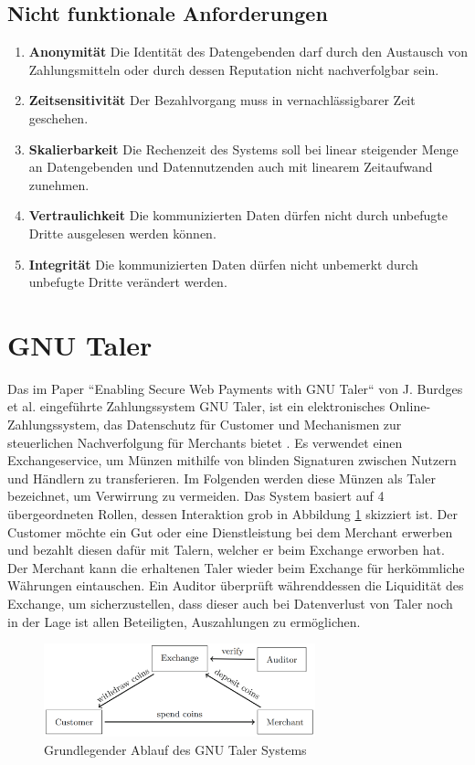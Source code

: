 \documentclass[11pt,a4paper]{scrreprt}
\begin{document}
\subsection{Nicht funktionale Anforderungen}
\label{enum:req:nichtfunktional}
\begin{enumerate}
    \item \textbf{Anonymität} Die Identität des Datengebenden darf durch den Austausch von Zahlungsmitteln oder durch dessen Reputation nicht nachverfolgbar sein.
    \item \textbf{Zeitsensitivität} Der Bezahlvorgang muss in vernachlässigbarer Zeit geschehen.
    \item \textbf{Skalierbarkeit} Die Rechenzeit des Systems soll bei linear steigender Menge an Datengebenden und Datennutzenden auch mit linearem Zeitaufwand zunehmen.
    \item \textbf{Vertraulichkeit} Die kommunizierten Daten dürfen nicht durch unbefugte Dritte ausgelesen werden können.
    \item \textbf{Integrität} Die kommunizierten Daten dürfen nicht unbemerkt durch unbefugte Dritte verändert werden.
\end{enumerate}


\section{GNU Taler}
\label{subsec:gnu}
Das im Paper ``Enabling Secure Web Payments with GNU Taler`` von J. Burdges et al. eingeführte Zahlungssystem GNU Taler, ist ein elektronisches Online-Zahlungssystem, das Datenschutz für Customer und Mechanismen zur steuerlichen Nachverfolgung für Merchants bietet \cite{gnu-burdges2016enabling}. Es verwendet einen Exchangeservice, um Münzen mithilfe von blinden Signaturen zwischen Nutzern und Händlern zu transferieren. Im Folgenden werden diese Münzen als Taler bezeichnet, um Verwirrung zu vermeiden. Das System basiert auf 4 übergeordneten Rollen, dessen Interaktion grob in Abbildung \ref{fig:gnu_taler_overview} skizziert ist. Der Customer möchte ein Gut oder eine Dienstleistung bei dem Merchant erwerben und bezahlt diesen dafür mit Talern, welcher er beim Exchange erworben hat. Der Merchant kann die erhaltenen Taler wieder beim Exchange für herkömmliche Währungen eintauschen. Ein Auditor überprüft währenddessen die Liquidität des Exchange, um sicherzustellen, dass dieser auch bei Datenverlust von Taler noch in der Lage ist allen Beteiligten, Auszahlungen zu ermöglichen.

\begin{figure}[H]
    \centering
    \includegraphics[width=0.7\textwidth]{gnu_system_graphic.png}
    \caption{Grundlegender Ablauf des GNU Taler Systems \cite{gnu-burdges2016enabling}}
    \label{fig:gnu_taler_overview}
\end{figure}
\end{document}
